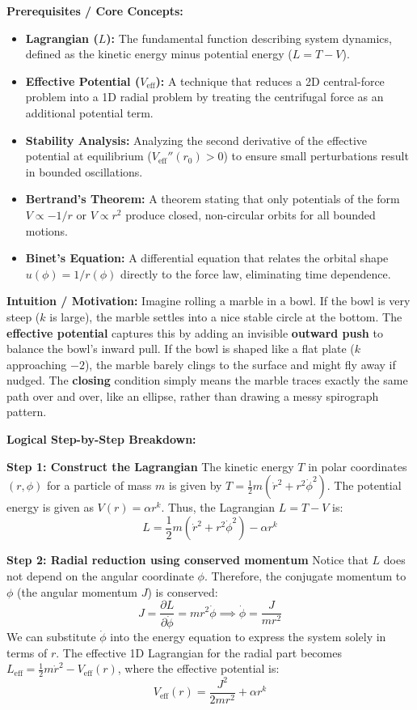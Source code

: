 \begin{solution}
\textbf{Prerequisites / Core Concepts:}
\begin{itemize}
    \item \textbf{Lagrangian ($L$):} The fundamental function describing system dynamics, defined as the kinetic energy minus potential energy ($L = T - V$).
    \item \textbf{Effective Potential ($V_{\text{eff}}$):} A technique that reduces a 2D central-force problem into a 1D radial problem by treating the centrifugal force as an additional potential term.
    \item \textbf{Stability Analysis:} Analyzing the second derivative of the effective potential at equilibrium ($V_{\text{eff}}''(r_0) > 0$) to ensure small perturbations result in bounded oscillations.
    \item \textbf{Bertrand's Theorem:} A theorem stating that only potentials of the form $V \propto -1/r$ or $V \propto r^2$ produce closed, non-circular orbits for all bounded motions.
    \item \textbf{Binet's Equation:} A differential equation that relates the orbital shape $u(\phi) = 1/r(\phi)$ directly to the force law, eliminating time dependence.
\end{itemize}

\textbf{Intuition / Motivation:}
Imagine rolling a marble in a bowl. If the bowl is very steep ($k$ is large), the marble settles into a nice stable circle at the bottom. The \textbf{effective potential} captures this by adding an invisible \textbf{outward push} to balance the bowl's inward pull. If the bowl is shaped like a flat plate ($k$ approaching $-2$), the marble barely clings to the surface and might fly away if nudged. The \textbf{closing} condition simply means the marble traces exactly the same path over and over, like an ellipse, rather than drawing a messy spirograph pattern.

\textbf{Logical Step-by-Step Breakdown:}

\textbf{Step 1: Construct the Lagrangian}
The kinetic energy $T$ in polar coordinates $(r, \phi)$ for a particle of mass $m$ is given by $T = \frac{1}{2}m(\dot{r}^2 + r^2\dot{\phi}^2)$.
The potential energy is given as $V(r) = \alpha r^k$.
Thus, the Lagrangian $L = T - V$ is:
\[ L = \frac{1}{2}m(\dot{r}^2 + r^2\dot{\phi}^2) - \alpha r^k \]

\textbf{Step 2: Radial reduction using conserved momentum}
Notice that $L$ does not depend on the angular coordinate $\phi$. Therefore, the conjugate momentum to $\phi$ (the angular momentum $J$) is conserved:
\[ J = \frac{\partial L}{\partial \dot{\phi}} = m r^2 \dot{\phi} \implies \dot{\phi} = \frac{J}{mr^2} \]
We can substitute $\dot{\phi}$ into the energy equation to express the system solely in terms of $r$. The effective 1D Lagrangian for the radial part becomes $L_{\text{eff}} = \frac{1}{2}m\dot{r}^2 - V_{\text{eff}}(r)$, where the effective potential is:
\[ V_{\text{eff}}(r) = \frac{J^2}{2mr^2} + \alpha r^k \]


\end{solution}
